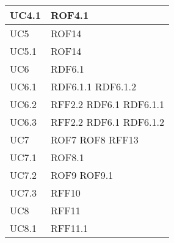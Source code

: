 \documentclass[../AnalisideiRequisiti.tex]{subfiles}
\begin{document}
\begin{longtable}{| p{4cm} | p{4cm} |}
		\hline
		\newline UC4.1 &  \newline ROF4.1 \\[1em]
		\hline
		\newline UC5 &  \newline ROF14 \\[1em]
		\hline
		\newline UC5.1 &  \newline ROF14 \\[1em]
		\hline
		\newline UC6 &  \newline RDF6.1 \\[1em]
		\hline
		\newline UC6.1 &  \newline RDF6.1.1 \newline RDF6.1.2 \\[1em]
		\hline
		\newline UC6.2 &  \newline RFF2.2 \newline RDF6.1 \newline RDF6.1.1 \\[1em]
		\hline
		\newline UC6.3 &  \newline RFF2.2 \newline RDF6.1 \newline RDF6.1.2 \\[1em]
		\hline
		\newline UC7 &  \newline ROF7 \newline ROF8 \newline RFF13 \\[1em]
		\hline
		\newline UC7.1 &  \newline ROF8.1 \\[1em]
		\hline
		\newline UC7.2 &  \newline ROF9 \newline ROF9.1 \\[1em]
		\hline
		\newline UC7.3 &  \newline RFF10 \\[1em]
		\hline
		\newline UC8 &  \newline RFF11 \\[1em]
		\hline
		\newline UC8.1 &  \newline RFF11.1 \\[1em]

\end{longtable}
\end{document}
